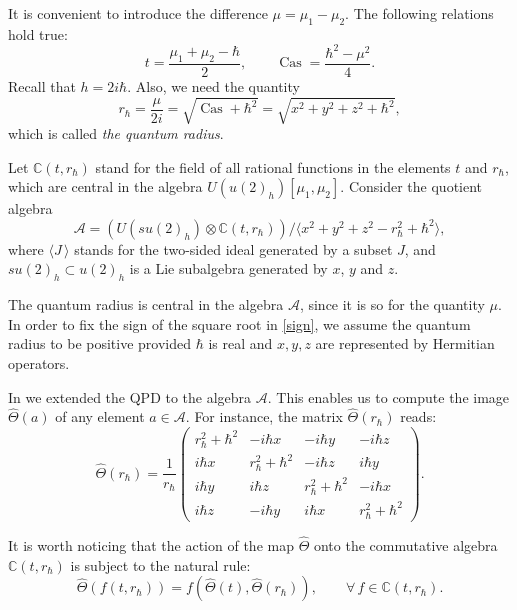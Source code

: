 \documentclass[11pt]{article}
\newcommand{\ot}{\otimes}
\newcommand{\C}{\mathbb{C}}
\renewcommand{\AA}{\mathcal{A}}
\DeclareMathOperator{\Cas}{Cas}
\newcommand{\hh}{\hbar}
\newcommand{\hatt}{\widehat{\Theta}}
\newcommand{\rh}{r_{\hbar}}
\numberwithin{equation}{section}
\theoremstyle{plain}
\theoremstyle{definition}
\begin{document}
It is convenient to introduce the difference $\mu=\mu_1-\mu_2$.
The following relations hold true:
\begin{equation}
t=\frac{\mu_1+\mu_2-\hh}{2},\qquad {{\Cas}}=\frac{\hh^2-\mu^2}{4}.
\label{cas}
\end{equation}
Recall that $h=2i\hh$. Also, we need the quantity
\begin{equation}
\rh=\frac{\mu}{2i}=\sqrt{\Cas+\hh^2}  = \sqrt{x^2+y^2+z^2+\hh^2},
\label{sign}
\end{equation}
which is called {\em the quantum radius}.

Let $\C(t,\rh) $ stand for the field of all rational functions in the elements $t$ and $\rh$, which are central in the algebra
$U(u(2)_h)[\mu_1,\mu_2]$. Consider the quotient algebra
\begin{equation}
\AA=\left(U(su(2)_h)\ot \C(t,\rh)\right)/\langle x^2+y^2+z^2-\rh^2+\hh^2 \rangle,
\label{quot}
\end{equation}
where $\langle J \,\rangle$ stands for the two-sided ideal generated by a subset $J$, and $su(2)_h\subset u(2)_h$ is a Lie
subalgebra generated by $x$, $y$ and $z$.

The quantum radius is central in the  algebra $\AA$, since it is so for the quantity $\mu$.
In order to fix the sign of the square root in \eqref{sign}, we assume  the quantum
radius to be positive provided $\hh$ is real and $x,y,z$ are  represented by Hermitian operators.

In \cite{GS2} we extended the QPD to the algebra $\AA$. This enables us to compute the image $\hatt(a)$
of any element  $a\in \AA$. For instance, the matrix $\hatt(\rh)$ reads:
\begin{equation} {\hatt}(\rh)=
\frac{1}{\rh}\left(\!\!
\begin{array}{cccc}
	\rh^2+\hh^2 &   \displaystyle -i\hh x\,& \displaystyle -i\hh y &\displaystyle -i\hh z\\
	\displaystyle  i\hh x&\rh^2+\hh^2&\displaystyle -i\hh z &\displaystyle i\hh y \\
	\displaystyle i\hh y &\displaystyle i\hh z & \rh^2+\hh^2 &\displaystyle -i\hh x\\
	\displaystyle i\hh z &\displaystyle -i\hh y & \displaystyle i\hh x& \rh^2+\hh^2
\end{array}
\!\!\right).
\label{mat1}
\end{equation}

It is worth noticing that  the action of the map $\hatt$ onto the commutative algebra $\C(t,\rh)$ is subject to the natural rule:
\[
\hatt(f(t,\rh))=f(\hatt(t), \hatt(\rh)),\qquad \forall\, f\in \C(t,\rh).
\]
\end{document}
